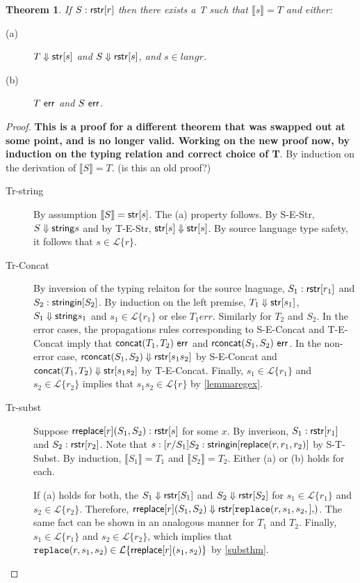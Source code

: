 \documentclass{acm_proc_article-sp}
\newtheorem{thm}{Theorem}
\theoremstyle{definition}
\newcommand{\Lagr}{\mathcal{L}}
\newcommand{\lang}[1]{\Lagr\{#1\}}
\newcommand{\sisubst}[3]{{\sf rreplace}[#1](#2,#3)} \newcommand{\rreplace}[3]{{\sf rreplace}[#1](#2,#3)} %
\newcommand{\sistr}[1]{{\sf rstr}[#1]}   \newcommand{\rstr}[1]{{\sf rstr}[#1]} %
\newcommand{\strin}[1]{\sistr{#1}}
\newcommand{\rsconcat}[2]{{\sf rconcat}(#1,#2)}
\newcommand{\stringin}[1]{{\sf stringin}[#1]}
\newcommand{\tsubst}[3]{{\sf replace}(#1,#2,#3)} \newcommand{\metareplace}[3]{{\sf replace}(#1,#2,#3)} %
\renewcommand{\tstr}[1]{{{\sf str}[#1]}}
\newcommand{\tconcat}[2]{{\sf concat}(#1,#2)}
\newcommand{\str}{{\sf string}}
\newcommand{\dosubst}[3]{{\tt replace}(#1,#2,#3)}
\newcommand{\err}{\ {\sf err}}
\newcommand{\trden}[1]{\llbracket #1 \rrbracket} %
\newcommand{\treduces}{ \Downarrow }
\newcommand{\sreduces}{ \Downarrow }
\begin{document}
\begin{thm}
If $S : \strin{r}$ then there exists a T such that $\trden{s} = T$ and either: 
\begin{description}
  \item[(a)] $T \treduces \tstr{s}$ and $S \sreduces \strin{s}$, and $s \in lang{r}$.
  \item[(b)] $T \err$ and $S \err$.
  \end{description}
\end{thm}
\begin{proof}
  \textbf{This is a proof for a different theorem that was swapped out at some point, 
    and is no longer valid. Working on the new proof now, by induction on the typing
  relation and correct choice of T}.
  By induction on the derivation of $\trden{S} = T$. (is this an old proof?) 
\begin{description}
\item[Tr-string] By assumption $\trden{S} = \tstr{s}$. The (a) property follows.
By S-E-Str, $S \sreduces \str{s}$ and by T-E-Str, $\tstr{s} \treduces \tstr{s}$.
By source language type safety, it follows that $s \in \lang{r}$.
\item[Tr-Concat]
By inversion of the typing relaiton for the source lnaguage, $S_1 : \strin{r_1}$ and $S_2 : \stringin{S_2}$.
By induction on the left premise, $T_1 \treduces \tstr{s_1}$, $S_1 \sreduces \str{s_1}$ and $s_1 \in \lang{r_1}$
or else $T_1 err$. 
Similarly for $T_2$ and $S_2$.
In the error cases, the propagations rules corresponding to S-E-Concat and T-E-Concat imply that $\tconcat{T_1}{T_2} \err$ and $\rsconcat{S_1}{S_2} \err$.
In the non-error case, $\rsconcat{S_1}{S_2} \sreduces \strin{s_1 s_2}$ by S-E-Concat and $\tconcat{T_1}{T_2} \treduces \tstr{s_1 s_2}$ by T-E-Concat.
Finally, $s_1 \in \lang{r_1}$ and $s_2 \in \lang{r_2}$ implies that $s_1 s_2 \in \lang{r}$ by \ref{lemmaregex}.
\item[Tr-subst]
Suppose $\sisubst{r}{S_1}{S_2} : \strin{s}$ for some $x$. 
By inverison, $S_1 : \strin{r_1}$ and $S_2 : \strin{r_2}$.
Note that $s : \subst{r}{S_1}{S_2} : \stringin{\tsubst{r}{r_1}{r_2}}$ by S-T-Subst.
By induction, $\trden{S_1} = T_1$ and $\trden{S_2} = T_2$.
Either (a) or (b) holds for each.

If (a) holds for both, the $S_1 \sreduces \strin{S_1}$ and $S_2 \sreduces \strin{S_2}$ for $s_1 \in \lang{r_1}$ and $s_2 \in \lang{r_2}$.
Therefore, $\sisubst{r}{S_1}{S_2} \sreduces \strin{\dosubst{r,s_1,s_2}}$.
The same fact can be shown in an analogous manner for $T_1$ and $T_2$.
Finally, $s_1 \in \lang{r_1}$ and $s_2 \in \lang{r_2}$, which implies that $\dosubst{r}{s_1}{s_2} \in \lang{\sisubst{r}{s_1}{s_2}}$ by \ref{substhm}.


\end{description}
\end{proof}
\end{document}
